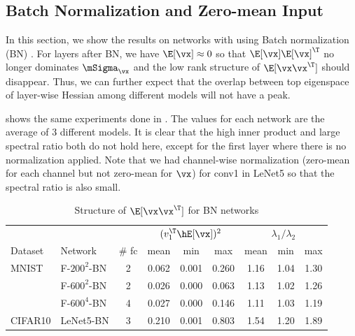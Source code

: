 \subsection{Batch Normalization and Zero-mean Input}
\label{sec:appendix_batchnorm}
In this section, we show the results on networks with using Batch normalization (BN) \citep{ioffe2015batch}. For layers after BN, we have $\E[\vx]\approx 0$ so that $\E[\vx]\E[\vx]^\T$ no longer dominates $\mSigma_\vx$ and the low rank structure of $\E[\vx\vx^\T]$ should disappear. Thus, we can further expect that the overlap between top eigenspace of layer-wise Hessian among different models will not have a peak.

 shows the same experiments done in . The values for each network are the average of 3 different models. It is clear that the high inner product and large spectral ratio both do not hold here, except for the first layer where there is no normalization applied. Note that we had channel-wise normalization (zero-mean for each channel but not zero-mean for $\vx$) for conv1 in LeNet5 so that the spectral ratio is also small.
\begin{table}[ht]
\small
    \centering
    \caption{Structure of $\E[\vx\vx^\T]$ for BN networks}
    \vskip 0.1in
    \begin{center}
    \begin{small}
\begin{tabular}{llccccccc}
\toprule
        &              &       & \multicolumn{3}{c}{$(v_1^\T\hE[\vx])^2$} & \multicolumn{3}{c}{$\lambda_1/\lambda_2$} \\
Dataset & Network      & \# fc & mean        & min         & max         & mean         & min          & max         \\
\midrule
MNIST   & F-$200^2$-BN & 2     & 0.062       & 0.001       & 0.260       & 1.16         & 1.04         & 1.30        \\
        & F-$600^2$-BN & 2     & 0.026       & 0.000       & 0.063       & 1.13         & 1.02         & 1.26        \\
        & F-$600^4$-BN & 4     & 0.027       & 0.000       & 0.146       & 1.11         & 1.03         & 1.19        \\
        \midrule
CIFAR10 & LeNet5-BN & 3     & 0.210       & 0.001       & 0.803       & 1.54         & 1.20         & 1.89        \\
        \bottomrule
\end{tabular}
    \end{small}
    \end{center}
  \label{tab:appendix_bn_xxT}%
\end{table}

